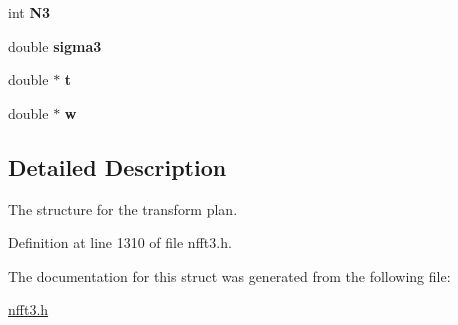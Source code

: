\begin{CompactItemize}
\item 
\hypertarget{structmri__inh__2d1d__plan_o5}{
int {\bf N3}}
\label{structmri__inh__2d1d__plan_o5}

\item 
\hypertarget{structmri__inh__2d1d__plan_o6}{
double {\bf sigma3}}
\label{structmri__inh__2d1d__plan_o6}

\item 
\hypertarget{structmri__inh__2d1d__plan_o7}{
double $\ast$ {\bf t}}
\label{structmri__inh__2d1d__plan_o7}

\item 
\hypertarget{structmri__inh__2d1d__plan_o8}{
double $\ast$ {\bf w}}
\label{structmri__inh__2d1d__plan_o8}

\end{CompactItemize}


\subsection{Detailed Description}
The structure for the transform plan. 



Definition at line 1310 of file nfft3.h.

The documentation for this struct was generated from the following file:\begin{CompactItemize}
\item 
\hyperlink{nfft3_8h}{nfft3.h}\end{CompactItemize}
